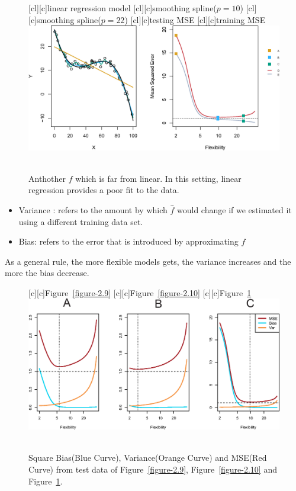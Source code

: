 \documentclass[12pt,a4paper]{article}%
\theoremstyle{definition}
\theoremstyle{plain}
\numberwithin{equation}{section}
\begin{document}
\begin{figure}[H]
\centering
{}[cl][c]{\tiny linear regression model}
[cl][c]{\tiny smoothing spline($p=10$)}
[cl][c]{\tiny smoothing spline($p=22$)}
[cl][c]{\tiny testing MSE}
[cl][c]{\tiny training MSE}
\includegraphics[scale=0.7]{images//2_11.eps}
\\~\\
\caption{Anthother $f$ which is far from linear. In this setting, linear regression provides a poor fit to the data.}\label{figure-2.11}
\end{figure}

\begin{itemize}
\item Variance : refers to the amount by which $\hat{f}$ would change if we estimated it using a different training data set.
\item Bias: refers to the error that is introduced by approximating $f$
\end{itemize}

As a general rule, the more flexible models gets, the variance increases and the more the bias decrease.

\begin{figure}[H]
\centering
{}[c][c]{\footnotesize Figure~\ref{figure-2.9}}
[c][c]{\footnotesize Figure~\ref{figure-2.10}}
[c][c]{\footnotesize Figure~\ref{figure-2.11}}
\includegraphics[scale=0.7]{images//2_12.eps}
\\~\\
\caption{Square Bias(Blue Curve), Variance(Orange Curve) and MSE(Red Curve) from test data of Figure~\ref{figure-2.9}, Figure~\ref{figure-2.10} and Figure~\ref{figure-2.11}.}\label{figure-2.12}
\end{figure}
\end{document}
